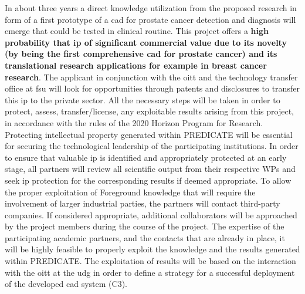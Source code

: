 In about three years a direct knowledge utilization from the proposed research in form of a first prototype of a \ac{cad} for prostate cancer detection and diagnosis will emerge that could be tested in clinical routine.
This project offers a \textbf{high probability that \ac{ip} of significant commercial value due to its novelty (by being the first comprehensive \ac{cad} for prostate cancer) and its translational research applications for example in breast cancer research}.
The applicant in conjunction with the \ac{oitt} and the technology transfer office at \ac{fsu} will look for opportunities through patents and disclosures to transfer this \ac{ip} to the private sector.
All the necessary steps will be taken in order to protect, assess, transfer/license, any exploitable results arising from this project, in accordance with the rules of the 2020 Horizon Program for Research.
Protecting intellectual property generated within PREDICATE will be essential for securing the technological leadership of the participating institutions.
In order to ensure that valuable \ac{ip} is identified and appropriately protected at an early stage, all partners will review all scientific output from their respective WPs and seek \ac{ip} protection for the corresponding results if deemed appropriate.
To allow the proper exploitation of Foreground knowledge that will require the involvement of larger industrial parties, the partners will contact third-party companies.
If considered appropriate, additional collaborators will be approached by the project members during the course of the project.
The expertise of the participating academic partners, and the contacts that are already in place, it will be highly feasible to properly exploit the knowledge and the results generated within PREDICATE.
The exploitation of results will be based on the interaction with the \ac{oitt} at the \ac{udg} in order to define a strategy for a successful deployment of the developed \ac{cad} system (C3).




